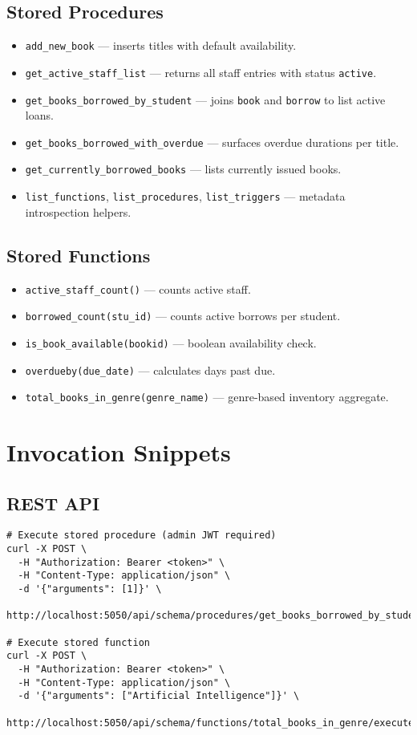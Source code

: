 \documentclass[12pt]{article}
\begin{document}
\subsection{Stored Procedures}
\begin{itemize}
  \item \texttt{add\_new\_book} --- inserts titles with default availability.
  \item \texttt{get\_active\_staff\_list} --- returns all staff entries with status \texttt{active}.
  \item \texttt{get\_books\_borrowed\_by\_student} --- joins \texttt{book} and \texttt{borrow} to list active loans.
  \item \texttt{get\_books\_borrowed\_with\_overdue} --- surfaces overdue durations per title.
  \item \texttt{get\_currently\_borrowed\_books} --- lists currently issued books.
  \item \texttt{list\_functions}, \texttt{list\_procedures}, \texttt{list\_triggers} --- metadata introspection helpers.
\end{itemize}

\subsection{Stored Functions}
\begin{itemize}
  \item \texttt{active\_staff\_count()} --- counts active staff.
  \item \texttt{borrowed\_count(stu\_id)} --- counts active borrows per student.
  \item \texttt{is\_book\_available(bookid)} --- boolean availability check.
  \item \texttt{overdueby(due\_date)} --- calculates days past due.
  \item \texttt{total\_books\_in\_genre(genre\_name)} --- genre-based inventory aggregate.
\end{itemize}

\section{Invocation Snippets}
\subsection{REST API}
\begin{lstlisting}[style=bashstyle,caption={Executing stored routines via backend APIs}]
# Execute stored procedure (admin JWT required)
curl -X POST \
  -H "Authorization: Bearer <token>" \
  -H "Content-Type: application/json" \
  -d '{"arguments": [1]}' \
  http://localhost:5050/api/schema/procedures/get_books_borrowed_by_student/execute

# Execute stored function
curl -X POST \
  -H "Authorization: Bearer <token>" \
  -H "Content-Type: application/json" \
  -d '{"arguments": ["Artificial Intelligence"]}' \
  http://localhost:5050/api/schema/functions/total_books_in_genre/execute
\end{lstlisting}
\end{document}
